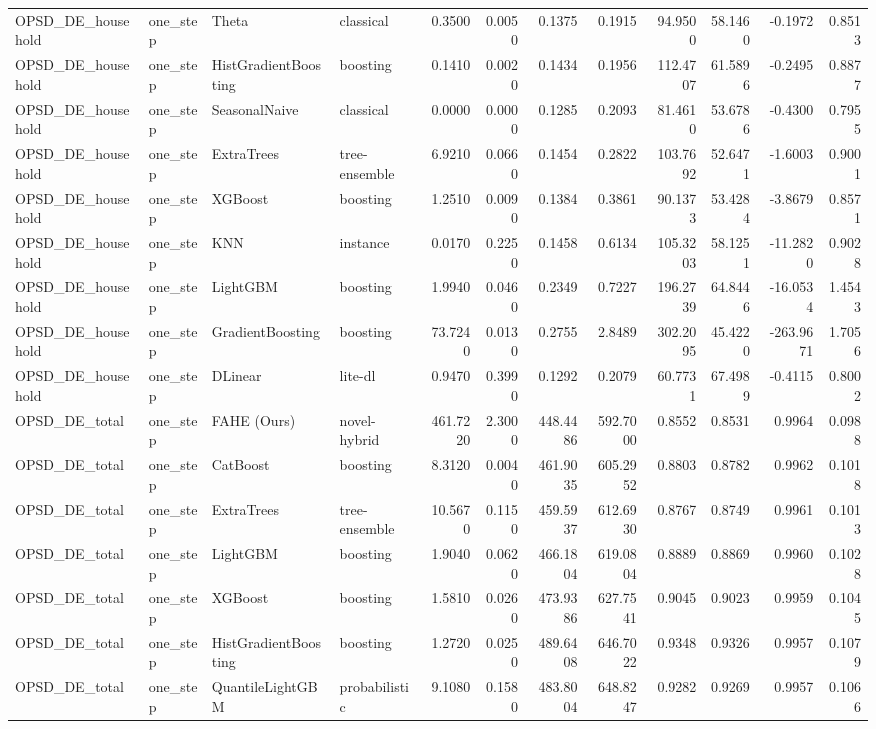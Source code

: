\begin{tabular}{llllrrrrrrrr}
OPSD_DE_household & one_step & Theta & classical & 0.3500 & 0.0050 & 0.1375 & 0.1915 & 94.9500 & 58.1460 & -0.1972 & 0.8513 \\
OPSD_DE_household & one_step & HistGradientBoosting & boosting & 0.1410 & 0.0020 & 0.1434 & 0.1956 & 112.4707 & 61.5896 & -0.2495 & 0.8877 \\
OPSD_DE_household & one_step & SeasonalNaive & classical & 0.0000 & 0.0000 & 0.1285 & 0.2093 & 81.4610 & 53.6786 & -0.4300 & 0.7955 \\
OPSD_DE_household & one_step & ExtraTrees & tree-ensemble & 6.9210 & 0.0660 & 0.1454 & 0.2822 & 103.7692 & 52.6471 & -1.6003 & 0.9001 \\
OPSD_DE_household & one_step & XGBoost & boosting & 1.2510 & 0.0090 & 0.1384 & 0.3861 & 90.1373 & 53.4284 & -3.8679 & 0.8571 \\
OPSD_DE_household & one_step & KNN & instance & 0.0170 & 0.2250 & 0.1458 & 0.6134 & 105.3203 & 58.1251 & -11.2820 & 0.9028 \\
OPSD_DE_household & one_step & LightGBM & boosting & 1.9940 & 0.0460 & 0.2349 & 0.7227 & 196.2739 & 64.8446 & -16.0534 & 1.4543 \\
OPSD_DE_household & one_step & GradientBoosting & boosting & 73.7240 & 0.0130 & 0.2755 & 2.8489 & 302.2095 & 45.4220 & -263.9671 & 1.7056 \\
OPSD_DE_household & one_step & DLinear & lite-dl & 0.9470 & 0.3990 & 0.1292 & 0.2079 & 60.7731 & 67.4989 & -0.4115 & 0.8002 \\
OPSD_DE_total & one_step & FAHE (Ours) & novel-hybrid & 461.7220 & 2.3000 & 448.4486 & 592.7000 & 0.8552 & 0.8531 & 0.9964 & 0.0988 \\
OPSD_DE_total & one_step & CatBoost & boosting & 8.3120 & 0.0040 & 461.9035 & 605.2952 & 0.8803 & 0.8782 & 0.9962 & 0.1018 \\
OPSD_DE_total & one_step & ExtraTrees & tree-ensemble & 10.5670 & 0.1150 & 459.5937 & 612.6930 & 0.8767 & 0.8749 & 0.9961 & 0.1013 \\
OPSD_DE_total & one_step & LightGBM & boosting & 1.9040 & 0.0620 & 466.1804 & 619.0804 & 0.8889 & 0.8869 & 0.9960 & 0.1028 \\
OPSD_DE_total & one_step & XGBoost & boosting & 1.5810 & 0.0260 & 473.9386 & 627.7541 & 0.9045 & 0.9023 & 0.9959 & 0.1045 \\
OPSD_DE_total & one_step & HistGradientBoosting & boosting & 1.2720 & 0.0250 & 489.6408 & 646.7022 & 0.9348 & 0.9326 & 0.9957 & 0.1079 \\
OPSD_DE_total & one_step & QuantileLightGBM & probabilistic & 9.1080 & 0.1580 & 483.8004 & 648.8247 & 0.9282 & 0.9269 & 0.9957 & 0.1066 \\

\end{tabular}
